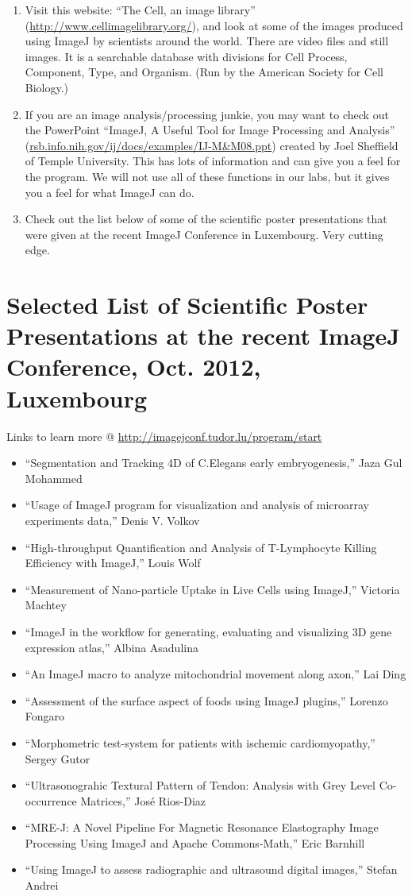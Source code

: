 \begin{enumerate}
\item Visit this website: ``The Cell, an image library'' (\url{http://www.cellimagelibrary.org/}), and look at some of the images produced using ImageJ by scientists around the world. There are video files and still images. It is a searchable database with divisions for Cell Process, Component, Type, and Organism. (Run by the American Society for Cell Biology.)
\item If you are an image analysis/processing junkie, you may want to check out the PowerPoint ``ImageJ, A Useful Tool for Image Processing and Analysis'' (\url{rsb.info.nih.gov/ij/docs/examples/IJ-M&M08.ppt}) created by Joel Sheffield of Temple University. This has lots of information and can give you a feel for the program. We will not use all of these functions in our labs, but it gives you a feel for what ImageJ can do.
\item Check out the list below of some of the scientific poster presentations that were given at the recent ImageJ Conference in Luxembourg. Very cutting edge.
\end{enumerate}
\section*{Selected List of Scientific Poster Presentations at the recent ImageJ Conference, Oct. 2012, Luxembourg}
Links to learn more @ \url{http://imagejconf.tudor.lu/program/start}
\begin{itemize}
\item ``Segmentation and Tracking 4D of C.Elegans early embryogenesis,'' Jaza Gul Mohammed
\item ``Usage of ImageJ program for visualization and analysis of microarray experiments data,'' Denis V. Volkov
\item ``High-throughput Quantification and Analysis of T-Lymphocyte Killing Efficiency with ImageJ,'' Louis Wolf
\item ``Measurement of Nano-particle Uptake in Live Cells using ImageJ,'' Victoria Machtey
\item ``ImageJ in the workflow for generating, evaluating and visualizing 3D gene expression atlas,'' Albina Asadulina
\item ``An ImageJ macro to analyze mitochondrial movement along axon,'' Lai Ding
\item ``Assessment of the surface aspect of foods using ImageJ plugins,'' Lorenzo Fongaro
\item ``Morphometric test-system for patients with ischemic cardiomyopathy,'' Sergey Gutor
\item ``Ultrasonograhic Textural Pattern of Tendon: Analysis with Grey Level Co-occurrence Matrices,'' José Rios-Diaz
\item ``MRE-J: A Novel Pipeline For Magnetic Resonance Elastography Image Processing Using ImageJ and Apache Commons-Math,'' Eric Barnhill
\item ``Using ImageJ to assess radiographic and ultrasound digital images,'' Stefan Andrei
\end{itemize}